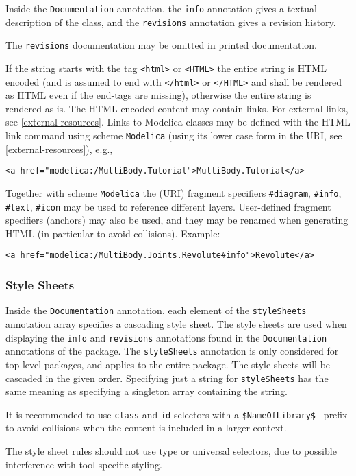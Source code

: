 Inside the \lstinline!Documentation! annotation, the \lstinline!info! annotation gives a textual description of the class, and the \lstinline!revisions! annotation gives a revision history.

\begin{nonnormative}
The \lstinline!revisions! documentation may be omitted in printed documentation.
\end{nonnormative}

If the string starts with the tag \lstinline!<html>! or \lstinline!<HTML>! the entire string is HTML encoded (and is assumed to end with \lstinline!</html>! or \lstinline!</HTML>! and shall be rendered as HTML even if the end-tags are missing), otherwise the entire string is rendered as is.
The HTML encoded content may contain links.
For external links, see \cref{external-resources}.
Links to Modelica classes may be defined with the HTML link command using scheme \lstinline!Modelica! (using its lower case form in the URI, see \cref{external-resources}), e.g.,
\begin{lstlisting}[language=modelica]
<a href="modelica:/MultiBody.Tutorial">MultiBody.Tutorial</a>
\end{lstlisting}

Together with scheme \lstinline!Modelica! the (URI) fragment specifiers \lstinline!#diagram!, \lstinline!#info!, \lstinline!#text!, \lstinline!#icon! may be used to reference different layers.
User-defined fragment specifiers (anchors) may also be used, and they may be renamed when generating HTML (in particular to avoid collisions).
Example:
\begin{lstlisting}[language=modelica]
<a href="modelica:/MultiBody.Joints.Revolute#info">Revolute</a>
\end{lstlisting}

\subsubsection{Style Sheets}\label{style-sheets}

Inside the \lstinline!Documentation! annotation, each element of the \lstinline!styleSheets! annotation array specifies a cascading style sheet.
The style sheets are used when displaying the \lstinline!info! and \lstinline!revisions! annotations found in the \lstinline!Documentation! annotations of the package.
The \lstinline!styleSheets! annotation is only considered for top-level packages, and applies to the entire package.
The style sheets will be cascaded in the given order.
Specifying just a string for \lstinline!styleSheets! has the same meaning as specifying a singleton array containing the string.
\begin{nonnormative}
It is recommended to use \lstinline[language=CSS]!class! and \lstinline[language=CSS]!id! selectors with a \lstinline[language=CSS]!$NameOfLibrary$-! prefix to avoid collisions when the content is included in a larger context.
\end{nonnormative}
The style sheet rules should not use type or universal selectors, due to possible interference with tool-specific styling.

